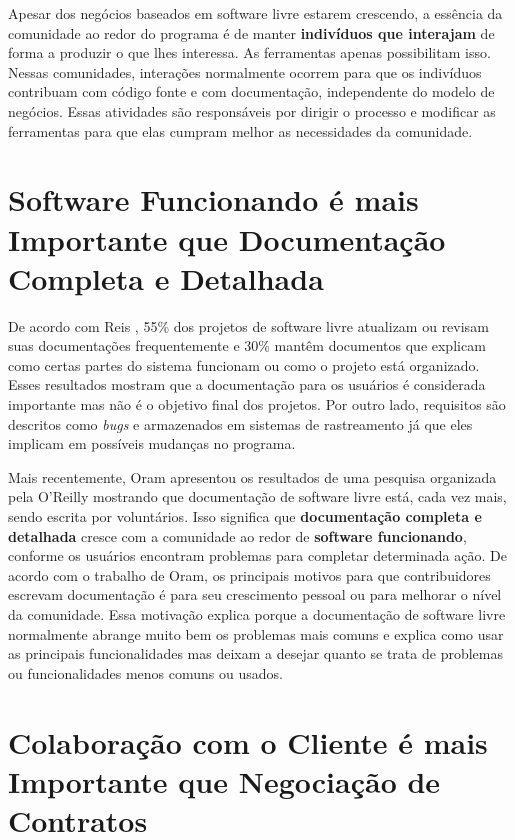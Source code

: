 Apesar dos negócios baseados em software livre estarem crescendo, a
essência da comunidade ao redor do programa é de manter
\textbf{indivíduos que interajam} de forma a produzir o que lhes
interessa. As ferramentas apenas possibilitam isso. Nessas
comunidades, interações normalmente ocorrem para que os indivíduos
contribuam com código fonte e com documentação, independente do modelo
de negócios. Essas atividades são responsáveis por dirigir o processo
e modificar as ferramentas para que elas cumpram melhor as
necessidades da comunidade.

\section{Software Funcionando é mais Importante que Documentação
  Completa e Detalhada}
\label{sec:second-princ}

De acordo com Reis \cite{Reis2003}, 55\% dos projetos de software
livre atualizam ou revisam suas documentações frequentemente e 30\%
mantêm documentos que explicam como certas partes do sistema funcionam
ou como o projeto está organizado. Esses resultados mostram que a
documentação para os usuários é considerada importante mas não é o
objetivo final dos projetos. Por outro lado, requisitos são descritos
como \emph{bugs}
e armazenados em sistemas de rastreamento já que eles implicam em
possíveis mudanças no programa.

Mais recentemente, Oram \cite{Oram2007} apresentou os resultados de
uma pesquisa organizada pela O'Reilly mostrando que documentação de
software livre está, cada vez mais, sendo escrita por
voluntários. Isso significa que \textbf{documentação completa e
  detalhada} cresce com a comunidade ao redor de \textbf{software
  funcionando}, conforme os usuários encontram problemas para
completar determinada ação. De acordo com o trabalho de Oram, os
principais motivos para que contribuidores escrevam documentação é
para seu crescimento pessoal ou para melhorar o nível da
comunidade. Essa motivação explica porque a documentação de software
livre normalmente abrange muito bem os problemas mais comuns e explica
como usar as principais funcionalidades mas deixam a desejar quanto se
trata de problemas ou funcionalidades menos comuns ou usados.

\section{Colaboração com o Cliente é mais Importante que Negociação de
  Contratos}
\label{sec:third-princ}

